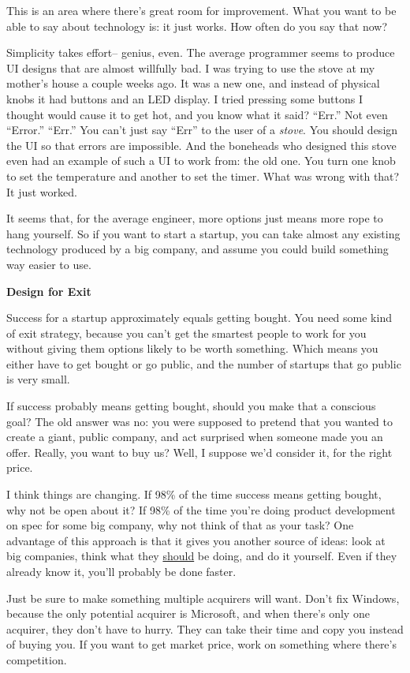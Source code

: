 \documentclass[12pt]{book}
\begin{document}
This is an area where there's great room for improvement. What you want
to be able to say about technology is: it just works. How often do you
say that now?

Simplicity takes effort-- genius, even. The average programmer seems to
produce UI designs that are almost willfully bad. I was trying to use
the stove at my mother's house a couple weeks ago. It was a new one, and
instead of physical knobs it had buttons and an LED display. I tried
pressing some buttons I thought would cause it to get hot, and you know
what it said? ``Err.'' Not even ``Error.'' ``Err.'' You can't just say
``Err'' to the user of a \emph{stove}. You should design the UI so that
errors are impossible. And the boneheads who designed this stove even
had an example of such a UI to work from: the old one. You turn one knob
to set the temperature and another to set the timer. What was wrong with
that? It just worked.

It seems that, for the average engineer, more options just means more
rope to hang yourself. So if you want to start a startup, you can take
almost any existing technology produced by a big company, and assume you
could build something way easier to use.

\textbf{Design for Exit}

Success for a startup approximately equals getting bought. You need some
kind of exit strategy, because you can't get the smartest people to work
for you without giving them options likely to be worth something. Which
means you either have to get bought or go public, and the number of
startups that go public is very small.

If success probably means getting bought, should you make that a
conscious goal? The old answer was no: you were supposed to pretend that
you wanted to create a giant, public company, and act surprised when
someone made you an offer. Really, you want to buy us? Well, I suppose
we'd consider it, for the right price.

I think things are changing. If 98\% of the time success means getting
bought, why not be open about it? If 98\% of the time you're doing
product development on spec for some big company, why not think of that
as your task? One advantage of this approach is that it gives you
another source of ideas: look at big companies, think what they
\href{http://kiko.com}{should} be doing, and do it yourself. Even if
they already know it, you'll probably be done faster.

Just be sure to make something multiple acquirers will want. Don't fix
Windows, because the only potential acquirer is Microsoft, and when
there's only one acquirer, they don't have to hurry. They can take their
time and copy you instead of buying you. If you want to get market
price, work on something where there's competition.
\end{document}
